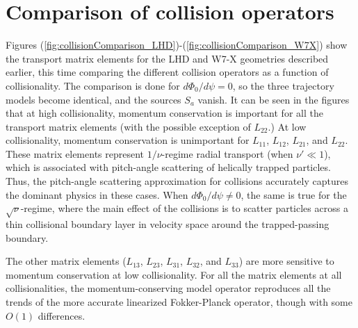 \documentclass[12pt]{revtex4}
\begin{document}
\section{Comparison of collision operators}
\label{sec:collisionComparison}

Figures (\ref{fig:collisionComparison_LHD})-(\ref{fig:collisionComparison_W7X}) show the transport
matrix elements for the LHD and W7-X geometries described earlier, this time comparing
the different collision operators as a function of collisionality.
The comparison is done for $d\Phi_0/d\psi=0$, so the three trajectory models
become identical, and the sources $S_a$ vanish.
It can be seen in the figures that at high collisionality,
momentum conservation is important for all the transport matrix elements (with the possible exception of $L_{22}$.)
At low collisionality, momentum conservation 
is unimportant for $L_{11}$, $L_{12}$, $L_{21}$, and $L_{22}$.
These matrix elements represent $1/\nu$-regime radial transport
(when $\nu' \ll 1$), which is associated with pitch-angle scattering of helically trapped particles.
Thus, the pitch-angle scattering approximation for collisions accurately
captures the dominant physics in these cases. 
When $d\Phi_0/d\psi \ne 0$, the same is true for the
$\sqrt{\nu}$-regime, where the main effect of the collisions is to
scatter particles across a thin collisional boundary layer in velocity
space around the trapped-passing boundary.

The other matrix elements ($L_{13}$, $L_{23}$, $L_{31}$, $L_{32}$, and $L_{33}$) 
are more sensitive to momentum conservation at low collisionality.
For all the matrix elements at all collisionalities, the momentum-conserving model operator
reproduces all the trends of the more accurate linearized Fokker-Planck operator,
though with some $O(1)$ differences.
\end{document}
